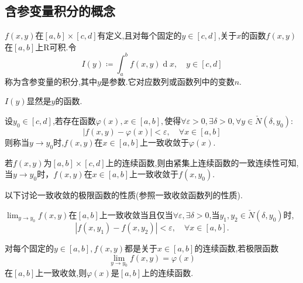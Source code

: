 \subsection{含参变量积分的概念}

\begin{definition}[含参变量的积分]
    $f(x,y)$在$[a,b]\times[c,d]$有定义,且对每个固定的$y\in [c,d]$,关于$x$的函数$f(x,y)$在$[a,b]$上R可积.令
    \[I(y)\coloneq\int_a^b f(x,y)\operatorname{d}x,\quad y\in [c,d]\]
    称为含参变量的积分,其中$y$是参数.它对应数列或函数列中的变数$n$.
\end{definition}

\begin{remark}
    $I(y)$显然是$y$的函数.
\end{remark}

\begin{definition}[一致收敛极限]
    设$y_0\in[c,d]$,若存在函数$\varphi(x),x\in [a,b],$使得$\forall\varepsilon >0,\exists\delta >0,\forall y\in \check{N}(\delta,y_0):$
    \[|f(x,y)-\varphi(x)|<\varepsilon,\quad\forall x\in[a,b]\]
    则称当$y\to y_0$时,$f(x,y)$在$x\in[a,b]$上一致收敛于$\varphi(x)$.
\end{definition}

\begin{remark}
    若$f(x,y)$为$[a,b]\times[c,d]$上的连续函数,则由紧集上连续函数的一致连续性可知,当$y\to y_0$时，$f(x,y)$在$x\in [a,b]$上一致收敛于$f(x,y_0)$.
\end{remark}

以下讨论一致收敛的极限函数的性质(参照一致收敛函数列的性质).

\begin{theorem}[极限函数一致收敛的Cauchy准则]
    $\lim_{y\to y_0}f(x,y)$在$[a,b]$上一致收敛当且仅当$\forall\varepsilon,\exists\delta >0$,当$y_1,y_2\in\check{N}(\delta,y_0)$时,
    \[|f(x,y_1)-f(x,y_2)|<\varepsilon,\quad\forall x\in[a,b].\]
\end{theorem}

\begin{proposition}[极限函数连续的充分条件]
    对每个固定的$y\in[a,b],f(x,y)$都是关于$x\in[a,b]$的连续函数,若极限函数
    \[\lim_{y\to y_0}f(x,y)=\varphi(x)\]
    在$[a,b]$上一致收敛,则$\varphi(x)$是$[a,b]$上的连续函数.
\end{proposition}